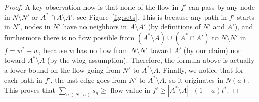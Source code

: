\begin{proof}
A key observation now is that none of the flow in $f'$ can pass by any node in $N\setminus N'$ or $A^*\cap A\setminus A'$; see Figure~\ref{fig:sets}. 
This is because any path in $f'$ starts in $N'$, nodes in $N'$ have no neighbors in $A\setminus A'$ (by definitions of $N'$ and $A'$), and furthermore there is no flow possible from $(A^*\setminus A)\cup (A^*\cap A')$ to $N\setminus N'$ in $f=w^*-w$, because $w$ has no flow from $N\setminus N'$ toward $A'$ (by our claim) nor toward $A^*\setminus A$ (by the wlog assumption).
Therefore, the formula above is actually a lower bound on the flow going from $N'$ to $A^*\setminus A$. Finally, we notice that for each path in $f'$, the last edge goes from $N'$ to $A^*\setminus A$, so it originates in $N(a)$. This proves that $\sum_{n\in N(a)} s_n\geq \text{ flow value in } f'\geq |A^* \setminus A|\cdot (1-a) t^*$.%
\end{proof}

